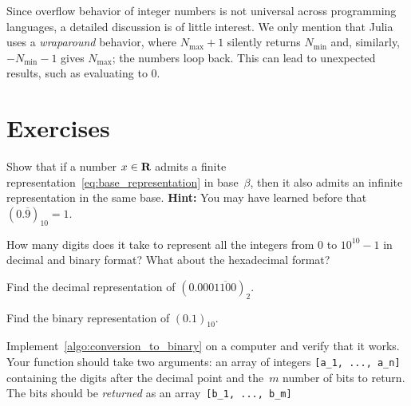 Since overflow behavior of integer numbers is not universal across programming languages,
a detailed discussion is of little interest.
We only mention that Julia uses a \emph{wraparound} behavior,
where $N_{\max} + 1$ silently returns $N_{\min}$ and,
similarly, $-N_{\min} - 1$ gives $N_{\max}$;
the numbers loop back.
This can lead to unexpected results,
such as  evaluating to 0.

\section{Exercises}
\begin{exercise}
    \label{exercise:non_unique_representation}
    Show that if a number $x \in \mathbf R$ admits a finite representation~\eqref{eq:base_representation} in base~$\beta$,
    then it also admits an infinite representation in the same base.
    \textbf{Hint:} You may have learned before that $(0.\overline 9)_{10} = 1$.
\end{exercise}

\begin{exercise}
    How many digits does it take to represent all the integers from 0 to $10^{10} - 1$ in decimal and binary format?
    What about the hexadecimal format?
\end{exercise}

\begin{exercise}
    Find the decimal representation of $(0.000\overline{1100})_2$.
\end{exercise}

\begin{exercise}
    \label{exercise:binary_zero_point_one}
    Find the binary representation of $(0.1)_{10}$.
\end{exercise}

\begin{compexercise}
    Implement~\cref{algo:conversion_to_binary} on a computer and verify that it works.
    Your function should take two arguments: an array of integers \verb?[a_1, ..., a_n]? containing the digits after the decimal point
    and the~$m$ number of bits to return.
    The bits should be \emph{returned} as an array~\verb?[b_1, ..., b_m]?
\end{compexercise}

